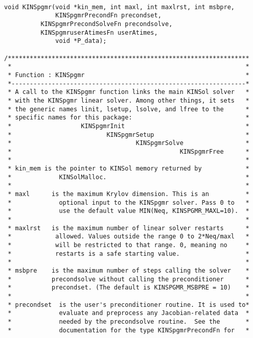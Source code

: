 \documentclass[11pt]{article}
\begin{document}
\small
\begin{verbatim}

void KINSpgmr(void *kin_mem, int maxl, int maxlrst, int msbpre,
              KINSpgmrPrecondFn precondset, 
          KINSpgmrPrecondSolveFn precondsolve,
          KINSpgmruserAtimesFn userAtimes,
              void *P_data);
     
/******************************************************************
 *                                                                *
 * Function : KINSpgmr                                            *
 *----------------------------------------------------------------*
 * A call to the KINSpgmr function links the main KINSol solver   *
 * with the KINSpgmr linear solver. Among other things, it sets   *
 * the generic names linit, lsetup, lsolve, and lfree to the      *
 * specific names for this package:                               *
 *                   KINSpgmrInit                                 *
 *                          KINSpgmrSetup                         *
 *                                  KINSpgmrSolve                 *
 *                                              KINSpgmrFree      *
 *                                                                *
 * kin_mem is the pointer to KINSol memory returned by            *
 *             KINSolMalloc.                                      *
 *                                                                *
 * maxl      is the maximum Krylov dimension. This is an          *
 *             optional input to the KINSpgmr solver. Pass 0 to   *
 *             use the default value MIN(Neq, KINSPGMR_MAXL=10).  *
 *                                                                *
 * maxlrst   is the maximum number of linear solver restarts      *
 *            allowed. Values outside the range 0 to 2*Neq/maxl   *
 *            will be restricted to that range. 0, meaning no     *
 *            restarts is a safe starting value.                  *
 *                                                                *
 * msbpre    is the maximum number of steps calling the solver    *
 *           precondsolve without calling the preconditioner      *
 *           precondset. (The default is KINSPGMR_MSBPRE = 10)    *
 *                                                                *
 * precondset  is the user's preconditioner routine. It is used to*
 *             evaluate and preprocess any Jacobian-related data  *
 *             needed by the precondsolve routine.  See the       *
 *             documentation for the type KINSpgmrPrecondFn for   *

\end{verbatim}
\end{document}
